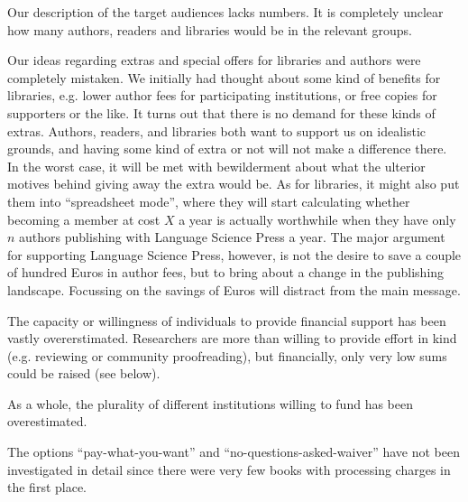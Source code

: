 \documentclass[nonflat,smallfont
]{langsci/langscibook}
\newcommand{\evaluation}[1]{
  \renewcommand{\tblslinecolour}{lsLightOrange}
  \tblssy{receipt}{Evaluation}{\vspace*{-5mm}#1}
}
\renewcommand{\tblssy}[4][black!12]{%
  \renewcommand{\langscisymbol}{#2}\renewcommand{\tblsboxcolor}{#1}
  \begin{mdframed}[style=yellowexercise,frametitle={#3}]
    #4
  \end{mdframed}
}
\begin{document}
\evaluation{
Our description of the target audiences lacks numbers. It is completely unclear how many authors, readers and libraries would be in the relevant groups. 

Our ideas regarding extras and special offers for libraries and authors were completely mistaken. We initially had thought about some kind of benefits for libraries, e.g. lower author fees for participating institutions, or free copies for supporters or the like. It turns out that there is no demand for these kinds of extras. Authors, readers,  and libraries both want to support us on idealistic grounds, and having some kind of extra or not will not make a difference there. In the worst case, it will be met with bewilderment about what the ulterior motives behind giving away the extra would be. As for libraries, it might also put them into ``spreadsheet mode'', where they will start calculating whether becoming a member at cost $X$ a year is actually worthwhile when they have only $n$ authors publishing with Language Science Press a year. The major argument for supporting Language Science Press, however, is not the desire to save a couple of hundred Euros in author fees, but to bring about a change in the publishing landscape. Focussing on the savings of Euros will distract from the main message. 

The capacity or willingness of individuals to provide financial support has been vastly overerstimated. Researchers are more than willing to provide effort in kind (e.g. reviewing or community proofreading), but financially, only very low sums could be raised (see below). 

As a whole, the plurality of different institutions willing to fund has been overestimated. 

The options ``pay-what-you-want'' and ``no-questions-asked-waiver'' have not been investigated in detail since there were very few books with processing charges in the first place. 


}
\end{document}
